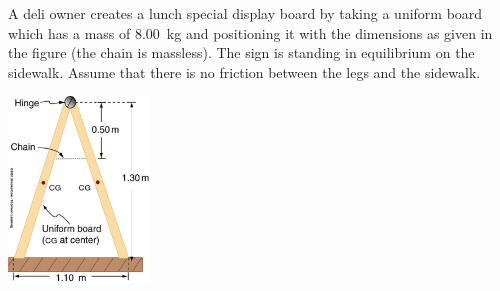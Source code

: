 \documentclass[letterpaper,addpoints,answers]{exam}
\begin{document}
\begin{questions}

\question
A deli owner creates a lunch special display board by taking a uniform board which has a mass of 8.00~kg and positioning it with the dimensions as given in the figure (the chain is massless). The sign is standing in equilibrium on the sidewalk. Assume that there is no friction between the legs and the sidewalk.
\begin{center}
 \includegraphics[width=0.28\textwidth]{test3/sandwich_board}
\end{center}

\pagebreak

\question
\def\iangle{30} %
\def\arcr{0.75cm} %


\end{questions}
\end{document}
